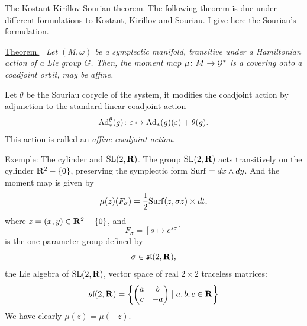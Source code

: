 \begin{Article}{The Kostant-Kirillov-Souriau theorem.}{}
  The following theorem is due under different formulations to Kostant,
  Kirillov and Souriau.
  I give here the Souriau's formulation.
  
  \uline{Theorem.}~ {\itshape Let $(M,\omega)$ be a symplectic manifold,
  transitive under a Hamiltonian action of a Lie group $G$.
  Then,
  the moment map $\mu \colon M \to \mathcal{G}^*$ is a covering onto a coadjoint orbit,
  may be affine.}
  
  Let $\theta$ be the Souriau cocycle of the system,
  it modifies the coadjoint action by adjunction to the standard linear coadjoint action
  $$%
    \Ad_*^\theta (g) \colon \epsilon \mapsto \Ad_*(g)(\epsilon) + \theta(g).
    $$%
  This action is called an \emph{affine coadjoint action}.
\end{Article}

\begin{Article}{Exemple: The cylinder and $\mathrm{SL}(2,\mathbf{R})$.}{}
  The group $\mathrm{SL}(2,\mathbf{R})$ acts transitively on the cylinder $\mathbf{R}^2 - \{0\}$,
  preserving the symplectic form ${\operatorname{Surf}} = dx \wedge dy$.
  And the moment map is given by
  $$%
    \mu(z)(F_\sigma) = \frac{1}{2} \Surf(z,\sigma z) \times dt,
    $$%
  where $z = (x,y) \in \mathbf{R}^2 - \{0\}$,
  and
  $$%
    F_\sigma = \left[s \mapsto e^{s\sigma}\right]
    $$%
  is the one-parameter group defined by
  $$%
    \sigma \in \LieAlgebra{SL}(2,\RR),
    $$%
  the Lie algebra of\/ $\mathrm{SL}(2,\mathbf{R})$\/,
  vector space of real $2 \times 2$ traceless matrices:
  $$%
    \LieAlgebra{SL}(2,\RR) = \left\{ \Vector{a & b \\ c & -a} \mid a,b,c \in \RR \right\}
    $$%
  We have clearly $\mu(z) = \mu(-z)$.
\end{Article}

